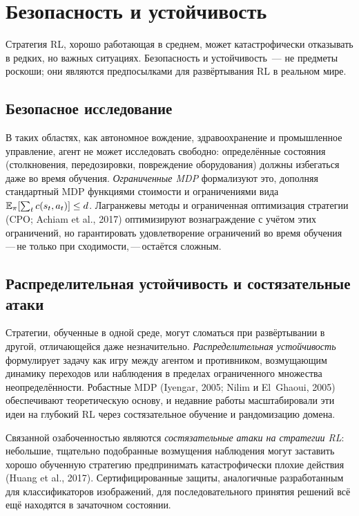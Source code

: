 \section{Безопасность и устойчивость}
\label{sec:open-safety}

Стратегия RL, хорошо работающая в среднем, может катастрофически отказывать
в редких, но важных ситуациях. Безопасность и устойчивость~---
не предметы роскоши; они являются предпосылками для развёртывания RL
в реальном мире.

\subsection{Безопасное исследование}

В таких областях, как автономное вождение, здравоохранение и промышленное
управление, агент не может исследовать свободно: определённые состояния
(столкновения, передозировки, повреждение оборудования) должны избегаться даже во время
обучения. \emph{Ограниченные MDP} формализуют
это, дополняя стандартный MDP функциями стоимости и
ограничениями вида $\operatorname{\mathbb{E}}_\pi[\sum_t c(s_t, a_t)] \leq d$.
Лагранжевы методы и ограниченная оптимизация стратегии (CPO;
Achiam et al., 2017) оптимизируют вознаграждение с учётом этих ограничений,
но гарантировать удовлетворение ограничений во время обучения\,---\,не
только при сходимости,\,---\,остаётся сложным.

\subsection{Распределительная устойчивость и состязательные атаки}

Стратегии, обученные в одной среде, могут сломаться при развёртывании в другой,
отличающейся даже незначительно. \emph{Распределительная устойчивость}
формулирует задачу как игру между агентом и противником,
возмущающим динамику переходов или наблюдения в пределах
ограниченного множества неопределённости. Робастные MDP (Iyengar, 2005; Nilim и
El~Ghaoui, 2005) обеспечивают теоретическую основу, и недавние работы
масштабировали эти идеи на глубокий RL через состязательное обучение и
рандомизацию домена.

Связанной озабоченностью являются \emph{состязательные атаки на стратегии RL}:
небольшие, тщательно подобранные возмущения наблюдения могут заставить
хорошо обученную стратегию предпринимать катастрофически плохие действия (Huang et
al., 2017). Сертифицированные защиты, аналогичные разработанным для
классификаторов изображений, для последовательного
принятия решений всё ещё находятся в зачаточном состоянии.

